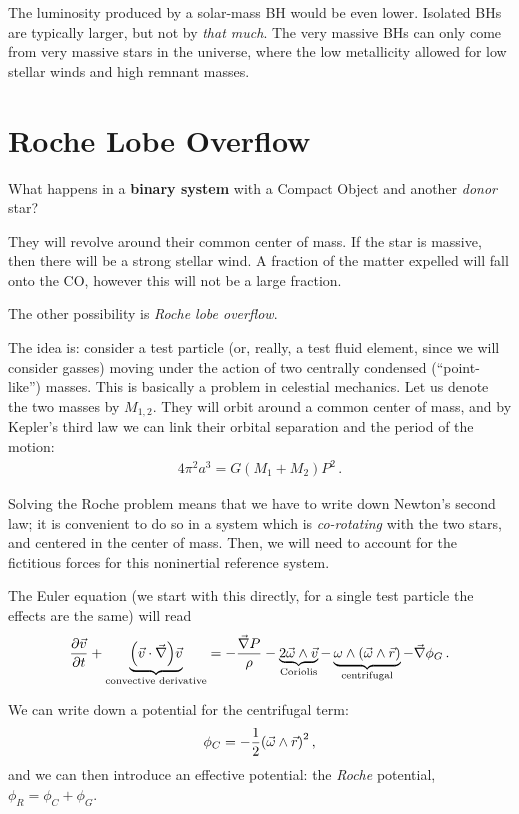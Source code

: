 \documentclass[main.tex]{subfiles}
\begin{document}
The luminosity produced by a solar-mass BH would be even lower.
Isolated BHs are typically larger, but not by \emph{that much}. The very massive BHs can only come from very massive stars in the universe, where the low metallicity allowed for low stellar winds and high remnant masses. 

\section{Roche Lobe Overflow}

What happens in a \textbf{binary system} with a Compact Object and another \emph{donor} star? 

They will revolve around their common center of mass. 
If the star is massive, then there will be a strong stellar wind.
A fraction of the matter expelled will fall onto the CO, however this will not be a large fraction. 

The other possibility is \emph{Roche lobe overflow}. 

The idea is: consider a test particle (or, really, a test fluid element, since we will consider gasses) moving under the action of two centrally condensed (``point-like'') masses. This is basically a problem in celestial mechanics.
Let us denote the two masses by \(M_{1, 2}\). They will orbit around a common center of mass, and by Kepler's third law we can link their orbital separation and the period of the motion: 
%
\begin{align}
4 \pi^2 a^3 = G (M_1 + M_2 ) P^2
\,.
\end{align}

Solving the Roche problem means that we have to write down Newton's second law; it is convenient to do so in a system which is \emph{co-rotating} with the two stars, and centered in the center of mass.
Then, we will need to account for the fictitious forces for this noninertial reference system. 

The Euler equation (we start with this directly, for a single test particle the effects are the same) will read 
%
\begin{align}
\pdv{\vec{v}}{t} + \underbrace{\qty(\vec{v} \cdot \vec{\nabla}) \vec{v} }_{\text{convective derivative}}
= - \frac{\vec{\nabla} P}{\rho } - 
\underbrace{2 \vec{\omega} \wedge \vec{v}}_{\text{Coriolis}} 
 - \underbrace{\omega \wedge \qty(\vec{\omega} \wedge \vec{r})}_{\text{centrifugal}} - \vec{\nabla} \phi_G 
\,.
\end{align}

We can write down a potential for the centrifugal term: 
%
\begin{align}
\phi _C = - \frac{1}{2} \qty(\vec{\omega} \wedge \vec{r})^2
\,,
\end{align}
%
and we can then introduce an effective potential: the \emph{Roche} potential, \(\phi _R = \phi _C + \phi _G\). 
\end{document}
